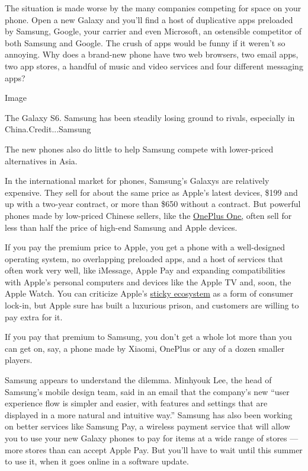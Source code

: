 The situation is made worse by the many companies competing for space on
your phone. Open a new Galaxy and you'll find a host of duplicative apps
preloaded by Samsung, Google, your carrier and even Microsoft, an
ostensible competitor of both Samsung and Google. The crush of apps
would be funny if it weren't so annoying. Why does a brand-new phone
have two web browsers, two email apps, two app stores, a handful of
music and video services and four different messaging apps?

Image

The Galaxy S6. Samsung has been steadily losing ground to rivals,
especially in China.Credit...Samsung

The new phones also do little to help Samsung compete with lower-priced
alternatives in Asia.

In the international market for phones, Samsung's Galaxys are relatively
expensive. They sell for about the same price as Apple's latest devices,
\$199 and up with a two-year contract, or more than \$650 without a
contract. But powerful phones made by low-priced Chinese sellers, like
the
\href{http://www.nytimes.com/2014/10/09/technology/personaltech/oneplus-one-review-high-hopes-for-low-price-phone.html?_r=0}{OnePlus
One,} often sell for less than half the price of high-end Samsung and
Apple devices.

If you pay the premium price to Apple, you get a phone with a
well-designed operating system, no overlapping preloaded apps, and a
host of services that often work very well, like iMessage, Apple Pay and
expanding compatibilities with Apple's personal computers and devices
like the Apple TV and, soon, the Apple Watch. You can criticize Apple's
\href{http://www.nytimes.com/2014/10/23/technology/personaltech/devices-with-yosemite-and-ios-8-operating-systems-seamlessly-connect-in-apples-ecosystem.html}{sticky
ecosystem} as a form of consumer lock-in, but Apple sure has built a
luxurious prison, and customers are willing to pay extra for it.

If you pay that premium to Samsung, you don't get a whole lot more than
you can get on, say, a phone made by Xiaomi, OnePlus or any of a dozen
smaller players.

Samsung appears to understand the dilemma. Minhyouk Lee, the head of
Samsung's mobile design team, said in an email that the company's new
``user experience flow is simpler and easier, with features and settings
that are displayed in a more natural and intuitive way.'' Samsung has
also been working on better services like Samsung Pay, a wireless
payment service that will allow you to use your new Galaxy phones to pay
for items at a wide range of stores --- more stores than can accept
Apple Pay. But you'll have to wait until this summer to use it, when it
goes online in a software update.

